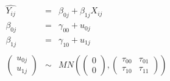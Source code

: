 \begin{equation}
	\begin{array}{lll}
		\hat{Y_{ij}}                                   & =    & \beta_{0j} + \beta_{1j} X_{ij}                                                                                                    \\
		\beta_{0j}                                     & =    & \gamma_{00} + u_{0j}                                                                                                              \\
		\beta_{1j}                                     & =    & \gamma_{10} + u_{1j}                                                                                                              \\ &&\\
		\begin{pmatrix} u_{0j} \\ u_{1j} \end{pmatrix} & \sim & MN \left( \begin{pmatrix} 0\\0\end{pmatrix},\begin{pmatrix} \tau_{00} & \tau_{01} \\ \tau_{10} & \tau_{11} \end{pmatrix} \right )
	\end{array}
\end{equation}
